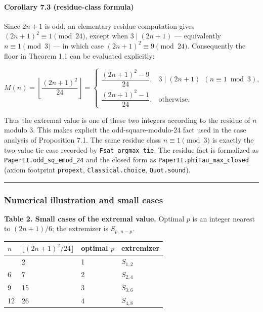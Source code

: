 \documentclass[
  american,
  11pt,
  a4paper,
]{article}
\newcounter{none} %
\begin{document}
\paragraph{Corollary 7.3 (residue-class formula)}\label{corollary-7.3-residue-class-formula}

Since \(2n+1\) is odd, an elementary residue computation gives
\((2n+1)^2\equiv1\pmod{24}\), except when \(3\mid(2n+1)\) --- equivalently \(n\equiv1\pmod3\) --- in which
case \((2n+1)^2\equiv9\pmod{24}\). Consequently the floor in Theorem 1.1 can be evaluated explicitly:

\[
M(n)=\left\lfloor\frac{(2n+1)^2}{24}\right\rfloor
=
\begin{cases}
\dfrac{(2n+1)^2-9}{24}, & 3\mid(2n+1)\ \ (n\equiv1\bmod3),\\[3mm]
\dfrac{(2n+1)^2-1}{24}, & \text{otherwise.}
\end{cases}
\]

Thus the extremal value is one of these two integers according to the residue of \(n\) modulo \(3\). This makes explicit the odd-square-modulo-\(24\) fact used in the case analysis of Proposition 7.1. The same residue class \(n\equiv1\pmod3\) is exactly the two-value tie case recorded by \texttt{Fsat\_argmax\_tie}. The residue fact is formalized as
\texttt{PaperII.odd\_sq\_emod\_24} and the closed form as \texttt{PaperII.phiTau\_max\_closed} (axiom footprint
\texttt{propext}, \texttt{Classical.choice}, \texttt{Quot.sound}).

\begin{center}\rule{0.5\linewidth}{0.5pt}\end{center}

\subsubsection{Numerical illustration and small cases}\label{numerical-illustration-and-small-cases}

\textbf{Table 2. Small cases of the extremal value.} Optimal \(p\) is an integer nearest to \((2n+1)/6\); the extremizer is \(S_{p,\,n-p}\).

{\def\LTcaptype{none} %
\begin{longtable}[]{@{}llll@{}}
\toprule\noalign{}
\(n\) & \(\lfloor(2n+1)^2/24\rfloor\) & optimal \(p\) & extremizer \\
\midrule\noalign{}
\endhead
\bottomrule\noalign{}
\endlastfoot
3 & 2 & 1 & \(S_{1,2}\) \\
6 & 7 & 2 & \(S_{2,4}\) \\
9 & 15 & 3 & \(S_{3,6}\) \\
12 & 26 & 4 & \(S_{4,8}\) \\
\end{longtable}
}
\end{document}

